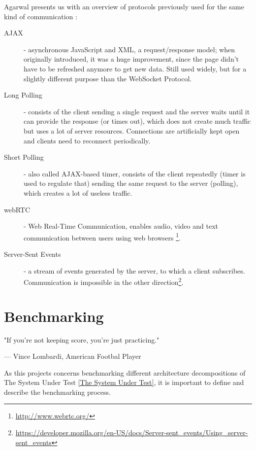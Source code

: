 \documentclass{uvamscse}
\begin{document}
Agarwal presents us with an overview of protocols previously used for the same kind of communication \cite{PushScale}:
\begin{description}
  \item[AJAX]
  - asynchronous JavaScript and XML, a request/response model; when originally introduced, it was a huge improvement, since the page didn’t have to be refreshed anymore to get new data. Still used widely, but for a slightly different purpose than the WebSocket Protocol.
  \item[Long Polling]
  - consists of the client sending a single request and the server waits until it can provide the response (or times out), which does not create much traffic but uses a lot of server resources. Connections are artificially kept open and clients need to reconnect periodically.
  \item[Short Polling]
  - also called AJAX-based timer, consists of the client repeatedly (timer is used to regulate that) sending the same request to the server (polling), which creates a lot of useless traffic.
  \item[webRTC]
  - Web Real-Time Communication, enables audio, video and text communication between users using web browsers \footnote{\url{http://www.webrtc.org/}}.
  \item[Server-Sent Events]
  - a stream of events generated by the server, to which a client subscribes. Communication is impossible in the other direction\footnote{\url{https://developer.mozilla.org/en-US/docs/Server-sent_events/Using_server-sent_events}}.
\end{description}

\chapter{Benchmarking}\label{Benchmarking}

\epigraph{"If you're not keeping score, you're just practicing."}{--- Vince Lombardi, American Footbal Player}

As this projects concerns benchmarking different architecture decompositions of The System Under Test \ref{The System Under Test}, it is important to define and describe the benchmarking process.
\end{document}

